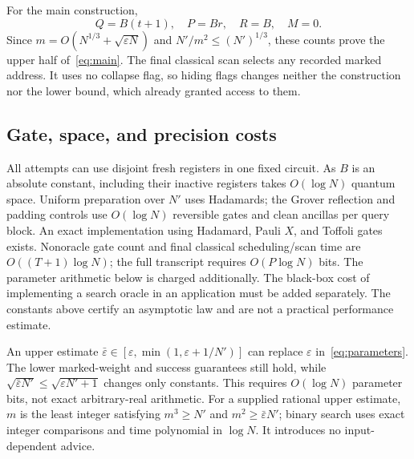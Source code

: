 \documentclass[11pt]{article}
\theoremstyle{remark}
\newcommand{\eps}{\varepsilon}
\begin{document}
For the main construction,
\begin{equation}\label{eq:resources}
 Q=B(t+1),\quad P=Br,\quad R=B,\quad M=0.
\end{equation}
Since $m=O(N^{1/3}+\sqrt{\eps N})$ and $N'/m^2\le(N')^{1/3}$,
these counts prove the upper half of~\eqref{eq:main}. The final classical
scan selects any recorded marked address. It uses no collapse flag, so
hiding flags changes neither the construction nor the lower bound, which
already granted access to them.

\subsection{Gate, space, and precision costs}\label{sec:resources}
All attempts can use disjoint fresh registers in one fixed circuit. As $B$
is an absolute constant, including their inactive registers takes
$O(\log N)$ quantum space. Uniform preparation over $N'$ uses Hadamards;
the Grover reflection and padding controls use $O(\log N)$ reversible gates
and clean ancillas per query block. An exact implementation using Hadamard,
Pauli $X$, and Toffoli gates exists. Nonoracle gate count and final classical
scheduling/scan time are $O((T+1)\log N)$; the full transcript requires
$O(P\log N)$ bits. The parameter arithmetic below is charged additionally.
The black-box cost of implementing a search oracle in an application must
be added separately. The constants above certify an asymptotic law and are
not a practical performance estimate.

An upper estimate $\bar\eps\in[\eps,\min(1,\eps+1/N')]$ can replace $\eps$
in~\eqref{eq:parameters}. The lower marked-weight and success guarantees
still hold, while $\sqrt{\bar\eps N'}\le\sqrt{\eps N'+1}$ changes only
constants. This requires $O(\log N)$ parameter bits, not exact arbitrary-real
arithmetic. For a supplied rational upper estimate, $m$ is the least integer satisfying
$m^3\ge N'$ and $m^2\ge\bar\eps N'$; binary search uses exact integer
comparisons and time polynomial in $\log N$. It introduces no input-dependent advice.
\end{document}
